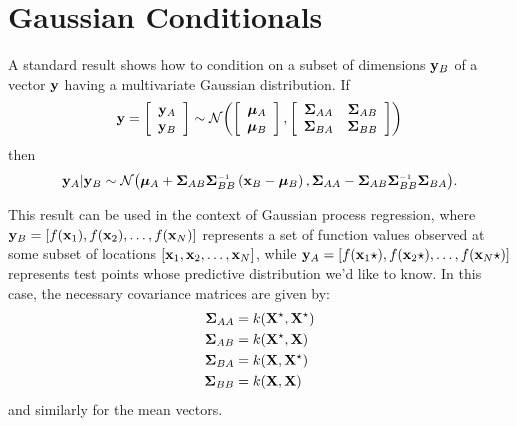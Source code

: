 
\inbpdocument

\chapter{Gaussian Conditionals}
\label{ch:appendix-gaussians}


A standard result shows how to condition on a subset of dimensions ${\bf{y}}_B$ of a vector ${\bf{y}}$ having a multivariate Gaussian distribution.
If
%
\begin{align}
{\bf{y}} = \left[ \begin{array}{c} {{\bf{y}}_A} \\ {{\bf{y}}_B} \end{array} \right] \sim \mathcal{N}\!\left(\left[ \begin{array}{c} {{\boldsymbol{\mu}}_A} \\ {{\boldsymbol{\mu}}_B} \end{array} \right],\left[ \begin{array}{cc}\mathbf{\Sigma}_{AA} & \mathbf{\Sigma}_{AB} \\ \mathbf{\Sigma}_{BA} & \mathbf{\Sigma}_{BB} \end{array} \right]\right)
\end{align}
%
then
%
\begin{align}
\vy_A | \vy_B \sim \mathcal{N} \big(\vmu_A + \vSigma_{AB} \vSigma_{BB}\inv \left( \vx_B - \vmu_B \right),
\vSigma_{AA} - \vSigma_{AB} \vSigma_{BB}\inv \vSigma_{BA} \big).
\label{eq:gauss_conditional}
\end{align}

This result can be used in the context of Gaussian process regression, where ${\bf{y}}_B = [f({\bf{x}}_1), f({\bf{x}}_2), \dots, f({\bf{x}}_N)]$ represents a set of function values observed at some subset of locations $[{\bf{x}}_1, {\bf{x}}_2, \dots, {\bf{x}}_N]$, while ${\bf{y}}_A = [f({\bf{x}}_1\star), f({\bf{x}}_2\star), \ldots, f({\bf{x}}_N\star)]$ represents test points whose predictive distribution we'd like to know.
In this case, the necessary covariance matrices are given by:
%
\begin{align}
\mathbf{\Sigma}_{AA} & = k(\mathbf{X}^\star, \mathbf{X}^\star) \\
\mathbf{\Sigma}_{AB} & = k(\mathbf{X}^\star, \mathbf{X}) \\
\mathbf{\Sigma}_{BA} & = k(\mathbf{X}, \mathbf{X}^\star) \\
\mathbf{\Sigma}_{BB} & = k(\mathbf{X}, \mathbf{X})
\end{align}
and similarly for the mean vectors.






